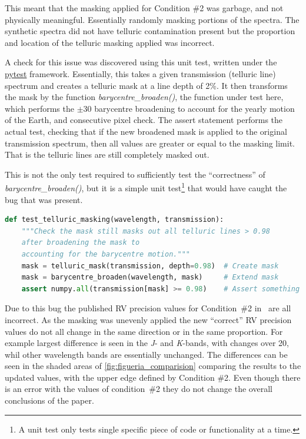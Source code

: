 This meant that the masking applied for Condition \#2 was garbage, and not physically meaningful.
Essentially randomly masking portions of the spectra.
The synthetic spectra did not have telluric contamination present but the proportion and location of the telluric masking applied was incorrect.

A check for this issue was discovered using this unit test, written under the \href{https://docs.pytest.org}{pytest} framework.
Essentially, this takes a given transmission (telluric line) spectrum and creates a telluric mask at a line depth of 2\%.
It then transforms the mask by the function \emph{barycentre\_broaden()}, the function under test here, which performs the \(\pm30\)\kmps{} barycentre broadening to account for the yearly motion of the Earth, and consecutive pixel check.
The assert statement performs the actual test, checking that if the new broadened mask is applied to the original transmission spectrum, then all values are greater or equal to the masking limit.
That is the telluric lines are still completely masked out.

This is not the only test required to sufficiently test the ``correctness'' of \emph{barycentre\_broaden()}, but it is a simple unit test\footnote{A unit test only tests  single specific piece of code or functionality at a time.} that would have caught the bug that was present.
\begin{lstlisting}[language=Python, caption=Example unit test to catch the masking bug.\ The assert statement checks that the mask continues to remove all telluric lines deeper than 2\%.]
def test_telluric_masking(wavelength, transmission):
    """Check the mask still masks out all telluric lines > 0.98 
    after broadening the mask to
    accounting for the barycentre motion."""
    mask = telluric_mask(transmission, depth=0.98)  # Create mask
    mask = barycentre_broaden(wavelength, mask)     # Extend mask
    assert numpy.all(transmission[mask] >= 0.98)    # Assert something about mask
\end{lstlisting}

Due to this bug the published {RV} precision values for Condition~\#2  in~\citet{figueira_radial_2016} are all incorrect.
As the masking was unevenly applied the new ``correct'' {RV} precision values do not all change in the same direction or in the same proportion.
For example largest difference is seen in the \emph{J}- and \emph{K}-bands, with changes over 20\mps{}, whil other wavelength bands are essentially unchanged.
The differences can be seen in the shaded areas of \cref{fig:figueria_comparision} comparing the \citet{figueira_radial_2016} results to the updated values, with the upper edge defined by Condition \#2.
Even though there is an error with the values of condition~\#2 they do not change the overall conclusions of the paper.
